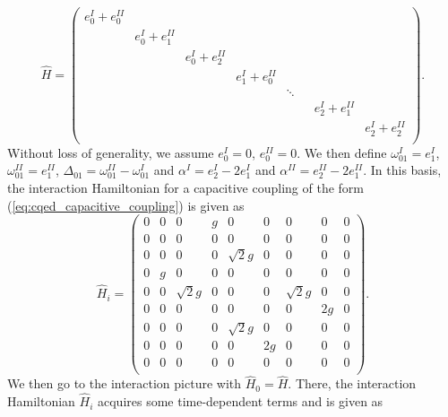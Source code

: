 \begin{equation}
\hat{H} = \left( \begin{array}{ccccccccc}
										e_0^I+e_0^{II} \\
										& e_{0}^I+e_1^{II} \\
										& & e_{0}^I+e_2^{II} \\
										& & & e_{1}^I+e_0^{II} \\
										& & & & \ddots \\
										& & & & & & e_{2}^{I}+e_1^{II} \\
										& & & & & & & e_{2}^{I}+e_2^{II} \\
									\end{array}
					\right).
\end{equation}
%
Without loss of generality, we assume $e_0^{I}=0$, $e_0^{II}=0$. We then define $\omega_{01}^I=e_1^{I}$, $\omega_{01}^{II}=e_1^{II}$, $\Delta_{01} = \omega_{01}^{II}-\omega_{01}^I$ and $\alpha^I = e_2^I-2e_1^{I}$ and $\alpha^{II} = e_2^{II}-2e_1^{II}$. In this basis, the interaction Hamiltonian for a capacitive coupling of the form (\ref{eq:cqed_capacitive_coupling}) is given as
%
\begin{equation}
\hat{H}_i = \left(
			\begin{array}{ccccccccc}
				0 & 0 & 0 & g & 0 & 0 & 0 & 0 & 0 \\
				0 & 0 & 0 & 0 & 0 & 0 & 0 & 0 & 0 \\
				0 & 0 & 0 & 0 & \sqrt{2}g & 0 & 0 & 0 & 0 \\
				0 & g & 0 & 0 & 0 & 0 & 0 & 0 & 0 \\
				0 & 0 & \sqrt{2}g & 0 & 0 & 0 & \sqrt{2}g & 0 & 0 \\
				0 & 0 & 0 & 0 & 0 & 0 & 0 & 2g & 0 \\
				0 & 0 & 0 & 0 & \sqrt{2}g & 0 & 0 & 0 & 0 \\
				0 & 0 & 0 & 0 & 0 & 2g & 0 & 0 & 0 \\
				0 & 0 & 0 & 0 & 0 & 0 & 0 & 0 & 0 \\
			\end{array}
		\right).
\end{equation} \label{eq:three_level_interaction_hamiltonian}
%
We then go to the interaction picture with $\hat{H}_0 = \hat{H}$. There, the interaction Hamiltonian $\hat{H}_i$ acquires some time-dependent terms and is given as
%
